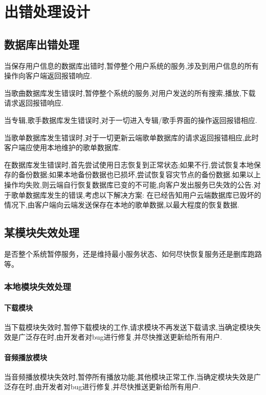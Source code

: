 \chapter{出错处理设计}
\section{数据库出错处理}
当保存用户信息的数据库出错时,暂停整个用户系统的服务,涉及到用户信息的所有操作向客户端返回报错响应.

当歌曲数据库发生错误时,暂停整个系统的服务,对用户发送的所有搜索,播放,下载请求返回报错响应.

当专辑,歌手数据库发生错误时,对于一切进入专辑/歌手界面的操作返回报错相应.

当歌单数据库发生错误时,对于一切更新云端歌单数据库的请求返回报错相应,此时客户端应使用本地维护的歌单数据库.

在数据库发生错误时,首先尝试使用日志恢复到正常状态;如果不行,尝试恢复本地保存的备份数据;如果本地备份数据也已损坏,尝试恢复容灾节点的备份数据.如果以上操作均失败,则云端自行恢复数据库已变的不可能,向客户发出服务已失效的公告.对于歌单数据库发生的错误,考虑以下解决方案:
在已经告知用户云端数据库已毁坏的情况下,由客户端向云端发送保存在本地的歌单数据,以最大程度的恢复数据.

\section{某模块失效处理}

是否整个系统暂停服务，还是维持最小服务状态、如何尽快恢复服务还是删库跑路等。
\subsection{本地模块失效处理}

\subsubsection{下载模块}

当下载模块失效时,暂停下载模块的工作,请求模块不再发送下载请求,当确定模块失效是广泛存在时,由开发者对bug进行修复,并尽快推送更新给所有用户.

\subsubsection{音频播放模块}

当音频播放模块失效时,暂停所有播放功能,其他模块正常工作,当确定模块失效是广泛存在时,由开发者对bug进行修复,并尽快推送更新给所有用户.

